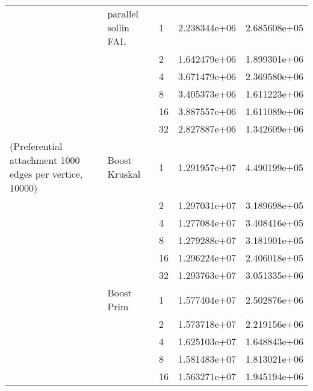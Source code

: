 \begin{tabular}{lllrr}
                                                       & parallel sollin FAL & 1  &  2.238344e+06 &  2.685608e+05 \\
                                                       &                     & 2  &  1.642479e+06 &  1.899301e+06 \\
                                                       &                     & 4  &  3.671479e+06 &  2.369580e+06 \\
                                                       &                     & 8  &  3.405373e+06 &  1.611223e+06 \\
                                                       &                     & 16 &  3.887557e+06 &  1.611089e+06 \\
                                                       &                     & 32 &  2.827887e+06 &  1.342609e+06 \\
(Preferential attachment 1000 edges per vertice, 10000) & Boost Kruskal & 1  &  1.291957e+07 &  4.490199e+05 \\
                                                       &                     & 2  &  1.297031e+07 &  3.189698e+05 \\
                                                       &                     & 4  &  1.277084e+07 &  3.408416e+05 \\
                                                       &                     & 8  &  1.279288e+07 &  3.181901e+05 \\
                                                       &                     & 16 &  1.296224e+07 &  2.406018e+05 \\
                                                       &                     & 32 &  1.293763e+07 &  3.051335e+06 \\
                                                       & Boost Prim & 1  &  1.577404e+07 &  2.502876e+06 \\
                                                       &                     & 2  &  1.573718e+07 &  2.219156e+06 \\
                                                       &                     & 4  &  1.625103e+07 &  1.648843e+06 \\
                                                       &                     & 8  &  1.581483e+07 &  1.813021e+06 \\
                                                       &                     & 16 &  1.563271e+07 &  1.945194e+06 \\

\end{tabular}
